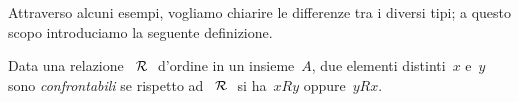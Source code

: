 Attraverso alcuni esempi, vogliamo chiarire le differenze tra i diversi tipi; 
a 
questo scopo introduciamo la seguente definizione.

\begin{definizione}
Data una relazione~\(~\mathcal{R}~\) d'ordine in un insieme~\(A\), due elementi 
distinti~\(x\) 
e~\(y\) sono \emph{confrontabili} se rispetto ad~\(~\mathcal{R}~\) si ha~\(x R y\) 
oppure~\(y R 
x\).
\end{definizione}

\begin{comment}
 
 \begin{esempio}

In base al diagramma di Eulero-Venn nella figura~\ref{fig:B.5} introduciamo 
nell'insieme di insiemi~\(S = \lbrace U, A, B, C, D, E, F \rbrace\) la 
relazione~\(\srel\): ``essere sottoinsieme di''.

Ricordiamo che, dati due insiemi~\(X\) e~\(Y\), \(X\) è \emph{sottoinsieme} 
di~\(Y\) 
quando ogni elemento di~\(X\) appartiene a~\(Y\) in simboli~\(X \subseteq Y\) 
e
si legge~\(X\) è contenuto in~\(Y\) o~\(X\) è uguale a~\(Y\).

Vogliamo studiare le proprietà della relazione~\(\srel\):

\begin{enumeratea}
\item poiché ogni insieme è sottoinsieme di se stesso, possiamo dire 
che~\(\srel\) 
è riflessiva;
\item se~\(X \subseteq Y\) e~\(X \neq Y\) allora~\(Y \not\subset X\) 
quindi~\(\srel\) è 
una relazione antisimmetrica;
\item se~\(X \subseteq Y\) e~\(Y \subseteq Z\) allora~\(X \subseteq Z\) 
quindi~\(\srel\) 
è una relazione transitiva.
\end{enumeratea}

Inoltre è evidente che esistono almeno due elementi dell'insieme~\(S\) che 
non 
sono in
alcun modo in relazione: ad esempio~\(A \not\subset D\) e~\(D \not\subset 
A\), 
ossia~\(A\) e~\(D\) non sono confrontabili.

 \end{esempio}

 \begin{esempio}

Riprendiamo il diagramma di Eulero-Venn dell'esempio precedente e 
introduciamo 
nell'insieme~\(S = \lbrace U, A, B, C, D, E, F \rbrace\) la 
relazione~\(\srel\):
``essere sottoinsieme proprio di''. Studiamo le proprietà di questa relazione:
\begin{itemize*}
 \item cosa è cambiato rispetto alla relazione precedente? \(\ldots\)
 \item sono ancora valide le proprietà antisimmetrica e transitiva? \(\ldots\)
 \item esistono elementi di~\(S\) non confrontabili? \(\ldots\)
\end{itemize*}


\end{comment}
